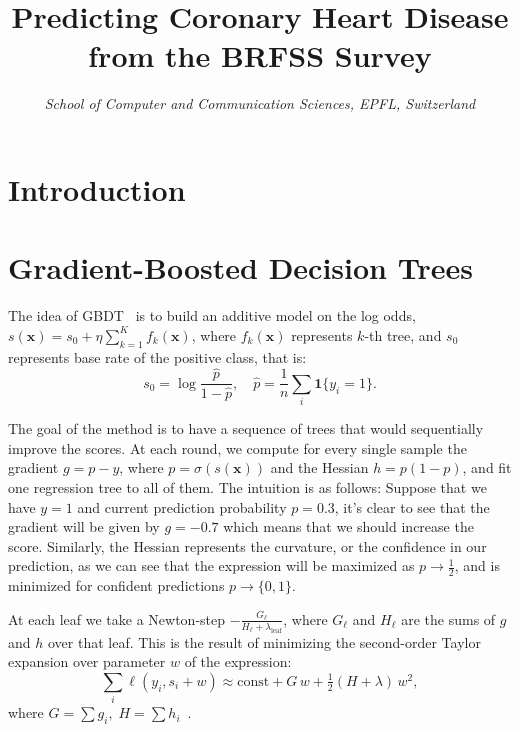 \documentclass[10pt,conference,compsocconf]{IEEEtran}
\begin{document}
\title{Predicting Coronary Heart Disease from the BRFSS Survey}

\author{
  \textit{School of Computer and Communication Sciences, EPFL, Switzerland}
}

\maketitle

\begin{abstract}
\end{abstract}

\section{Introduction}

\section{Gradient-Boosted Decision Trees}

The idea of GBDT~\cite{friedman01gbm} is to build an additive model on the log odds, $s(\mathbf{x}) = s_0 + \eta\sum_{k=1}^K{f_k(\mathbf{x})}$,
where $f_k(\mathbf{x})$ represents $k$-th tree, and $s_0$ represents base rate of the positive class, that is:
\begin{equation*}
  s_0 = \log{\frac{\hat{p}}{1-\hat{p}}}, \quad \hat{p} = \frac{1}{n}\sum_{i}{\mathbf{1}\{y_i = 1\}}.
\end{equation*}

The goal of the method is to have a sequence of trees that would sequentially improve the scores. At each round, we compute for every single sample the gradient $g = p - y$, where $p = \sigma(s(\mathbf{x}))$ and the Hessian $h = p(1 - p)$, and fit one regression tree to all of them. The intuition is as follows: Suppose that we have $y = 1$ and current prediction probability $p = 0.3$, it's clear to see that the gradient will be given by $g = -0.7$ which means that we should increase the score. Similarly, the Hessian represents the curvature, or the confidence in our prediction, as we can see that the expression will be maximized as $p \rightarrow \frac{1}{2}$, and is minimized for confident predictions $p \rightarrow \{0,1\}$. 

At each leaf we take a Newton-step $-\frac{G_\ell}{H_\ell + \lambda_{\text{leaf}}}$, where $G_\ell$ and $H_\ell$ are the sums of $g$ and $h$ over that leaf. This is the result of minimizing the second-order Taylor expansion over parameter $w$ of the expression:
\begin{equation*}
  \sum_i \ell(y_i, s_i + w) \approx \text{const} + G\,w + \tfrac12 (H + \lambda)\, w^2,
\end{equation*}
where $G = \sum g_i,\; H = \sum h_i$~\cite{chen16xgboost}.
\end{document}
